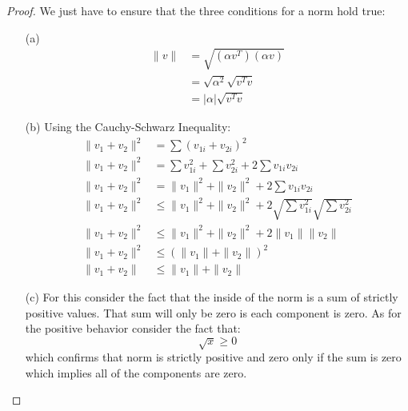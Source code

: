 \documentclass[12pt, letterpaper, onecolumn, conference, final]{IEEEtran}
\theoremstyle{definition}
\newtheorem{proposition}{Proposition}
\theoremstyle{plain}
\begin{document}
\begin{proof}
We just have to ensure that the three conditions for a norm hold true:
\begin{itemize}

\item[(a)]
\begin{equation*}
\begin{split}
\| v \| &= \sqrt{(\alpha v^T)(\alpha v)} \\
&= \sqrt{\alpha^2}\sqrt{v^Tv} \\
&= |\alpha|\sqrt{v^Tv}
\end{split}
\end{equation*}

\item[(b)]
Using the Cauchy-Schwarz Inequality:
\begin{equation*}
\begin{split}
\| v_1 + v_2 \|^2 &= \sum (v_{1i} + v_{2i})^2 \\
\| v_1 + v_2 \|^2 &= \sum v_{1i}^2 + \sum v_{2i}^2 + 2\sum v_{1i}v_{2i} \\
\| v_1 + v_2 \|^2 &= \| v_1 \|^2 + \| v_2 \|^2 + 2\sum v_{1i}v_{2i} \\
\| v_1 + v_2 \|^2 &\leq \| v_1 \|^2 + \| v_2 \|^2 + 2\sqrt{\sum v_{1i}^2}\sqrt{\sum v_{2i}^2} \\
\| v_1 + v_2 \|^2 &\leq \| v_1 \|^2 + \| v_2 \|^2 + 2\| v_1 \| \| v_2 \| \\
\| v_1 + v_2 \|^2 &\leq (\| v_1 \| + \| v_2 \|)^2 \\
\| v_1 + v_2 \| &\leq \| v_1 \| + \| v_2 \|
\end{split}
\end{equation*}

\item[(c)]
For this consider the fact that the inside of the norm is a sum of strictly positive values. That sum will only be zero is each component is zero. As for the positive behavior consider the fact that:
\begin{equation*}
\sqrt{x} \geq 0
\end{equation*}
which confirms that norm is strictly positive and zero only if the sum is zero which implies all of the components are zero.

\end{itemize}
\end{proof}

\newpage
\begin{center}
\end{center}
\end{document}
